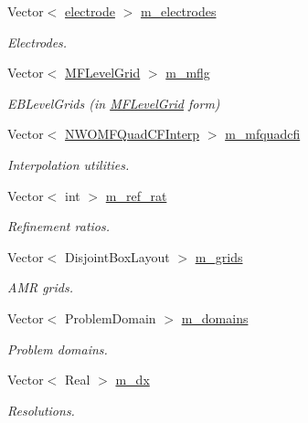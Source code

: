 \begin{DoxyCompactItemize}
Vector$<$ \hyperlink{classelectrode}{electrode} $>$ \hyperlink{classnwomfconductivityopfactory_a5be32bdb3baa52621b037d657ea5ab67}{m\+\_\+electrodes}
\begin{DoxyCompactList}\small\item\em Electrodes. \end{DoxyCompactList}\item 
Vector$<$ \hyperlink{classMFLevelGrid}{M\+F\+Level\+Grid} $>$ \hyperlink{classnwomfconductivityopfactory_aef2ddf9f6090d59149da9cce87cac954}{m\+\_\+mflg}
\begin{DoxyCompactList}\small\item\em E\+B\+Level\+Grids (in \hyperlink{classMFLevelGrid}{M\+F\+Level\+Grid} form) \end{DoxyCompactList}\item 
Vector$<$ \hyperlink{classNWOMFQuadCFInterp}{N\+W\+O\+M\+F\+Quad\+C\+F\+Interp} $>$ \hyperlink{classnwomfconductivityopfactory_ae5ecd6c1c043b72f9f69bb0fe644cc81}{m\+\_\+mfquadcfi}
\begin{DoxyCompactList}\small\item\em Interpolation utilities. \end{DoxyCompactList}\item 
Vector$<$ int $>$ \hyperlink{classnwomfconductivityopfactory_a524dda23094a7f925b292da49a253143}{m\+\_\+ref\+\_\+rat}
\begin{DoxyCompactList}\small\item\em Refinement ratios. \end{DoxyCompactList}\item 
Vector$<$ Disjoint\+Box\+Layout $>$ \hyperlink{classnwomfconductivityopfactory_ae0f196edcb4c195efd6a6663e11ac75d}{m\+\_\+grids}
\begin{DoxyCompactList}\small\item\em A\+MR grids. \end{DoxyCompactList}\item 
Vector$<$ Problem\+Domain $>$ \hyperlink{classnwomfconductivityopfactory_af2a633295a59ca4bfbb02eab7cccfbf4}{m\+\_\+domains}
\begin{DoxyCompactList}\small\item\em Problem domains. \end{DoxyCompactList}\item 
Vector$<$ Real $>$ \hyperlink{classnwomfconductivityopfactory_ac34b5ac6afcd62cb950c496d947a8fa4}{m\+\_\+dx}
\begin{DoxyCompactList}\small\item\em Resolutions. \end{DoxyCompactList}\item 

\end{DoxyCompactItemize}
